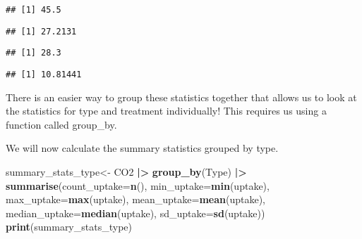 \documentclass[
]{article}
\newenvironment{Shaded}{\begin{snugshade}}{\end{snugshade}}
\newcommand{\AttributeTok}[1]{\textcolor[rgb]{0.13,0.29,0.53}{#1}}
\newcommand{\ConstantTok}[1]{\textcolor[rgb]{0.56,0.35,0.01}{#1}}
\newcommand{\FunctionTok}[1]{\textcolor[rgb]{0.13,0.29,0.53}{\textbf{#1}}}
\newcommand{\NormalTok}[1]{#1}
\newcommand{\OtherTok}[1]{\textcolor[rgb]{0.56,0.35,0.01}{#1}}
\newcommand{\SpecialCharTok}[1]{\textcolor[rgb]{0.81,0.36,0.00}{\textbf{#1}}}
\begin{document}
\begin{verbatim}
## [1] 45.5
\end{verbatim}

\begin{Shaded}
\end{Shaded}

\begin{verbatim}
## [1] 27.2131
\end{verbatim}

\begin{Shaded}
\end{Shaded}

\begin{verbatim}
## [1] 28.3
\end{verbatim}

\begin{Shaded}
\end{Shaded}

\begin{verbatim}
## [1] 10.81441
\end{verbatim}

There is an easier way to group these statistics together that allows us
to look at the statistics for type and treatment individually! This
requires us using a function called group\_by.

We will now calculate the summary statistics grouped by type.

\begin{Shaded}
\begin{Highlighting}[]
\NormalTok{summary\_stats\_type}\OtherTok{\textless{}{-}}\NormalTok{ CO2 }\SpecialCharTok{|\textgreater{}}
  \FunctionTok{group\_by}\NormalTok{(Type) }\SpecialCharTok{|\textgreater{}}
  \FunctionTok{summarise}\NormalTok{(}\AttributeTok{count\_uptake=}\FunctionTok{n}\NormalTok{(),}
            \AttributeTok{min\_uptake=}\FunctionTok{min}\NormalTok{(uptake), }
            \AttributeTok{max\_uptake=}\FunctionTok{max}\NormalTok{(uptake),}
            \AttributeTok{mean\_uptake=}\FunctionTok{mean}\NormalTok{(uptake),}
            \AttributeTok{median\_uptake=}\FunctionTok{median}\NormalTok{(uptake), }
            \AttributeTok{sd\_uptake=}\FunctionTok{sd}\NormalTok{(uptake))}
\FunctionTok{print}\NormalTok{(summary\_stats\_type)}
\end{Highlighting}
\end{Shaded}
\end{document}
